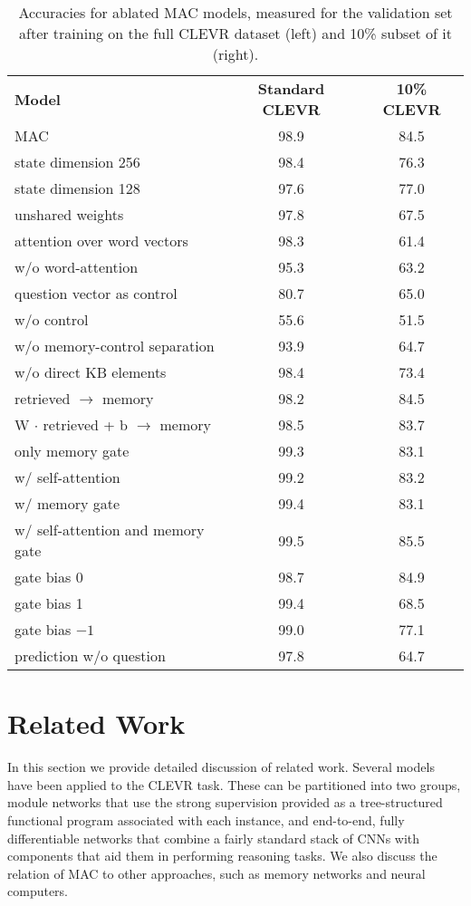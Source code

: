 \documentclass[fleqn]{article}
\begin{document}
\begin{table}
\caption{Accuracies for ablated MAC models, measured for the validation set after training on the full CLEVR dataset (left) and 10\% subset of it (right).}
\label{tab:table2}
\centering
\scriptsize
\begin{tabular}{lcc}
\rowcolor{Blue1}
\textbf{Model} & \textbf{Standard CLEVR} & \textbf{10\% CLEVR} \\
MAC & 98.9 & 84.5  \\
\rowcolor{Blue2}
state dimension 256 & 98.4 & 76.3  \\
\rowcolor{Blue2}
state dimension 128 & 97.6 & 77.0  \\
unshared weights & 97.8 & 67.5  \\
\rowcolor{Blue2}
attention over word vectors  & 98.3 & 61.4  \\
\rowcolor{Blue2}
w/o word-attention & 95.3 & 63.2  \\
\rowcolor{Blue2}
question vector as control & 80.7 & 65.0  \\
\rowcolor{Blue2}
w/o control & 55.6 & 51.5  \\
w/o memory-control separation  & 93.9 & 64.7  \\
w/o direct KB elements  & 98.4 & 73.4  \\
\rowcolor{Blue2}
retrieved $\rightarrow$ memory & 98.2 & 84.5  \\
\rowcolor{Blue2}
W $\cdot$ retrieved + b $\rightarrow$ memory &  98.5 &  83.7 \\
\rowcolor{Blue2}
only memory gate & 99.3 & 83.1  \\
w/ self-attention & 99.2 & 83.2   \\
w/ memory gate & 99.4 & 83.1  \\
w/ self-attention and memory gate & 99.5 & 85.5  \\
\rowcolor{Blue2}
gate bias 0 & 98.7 & 84.9  \\
\rowcolor{Blue2}
gate bias 1 & 99.4 & 68.5  \\
\rowcolor{Blue2}
gate bias $-1$ & 99.0 & 77.1  \\
prediction w/o question & 97.8 & 64.7
\end{tabular}
\end{table}

\section{Related Work}
\label{sec:related}

In this section we provide detailed discussion of related work. Several models have been applied
to the CLEVR task. These can be partitioned into two groups, module networks that use the strong
supervision provided as a tree-structured functional program associated with each instance, and
end-to-end, fully differentiable networks that combine a fairly standard stack of CNNs with components
that aid them in performing reasoning tasks. We also discuss the relation of MAC to other
approaches, such as memory networks and neural computers.
\end{document}
